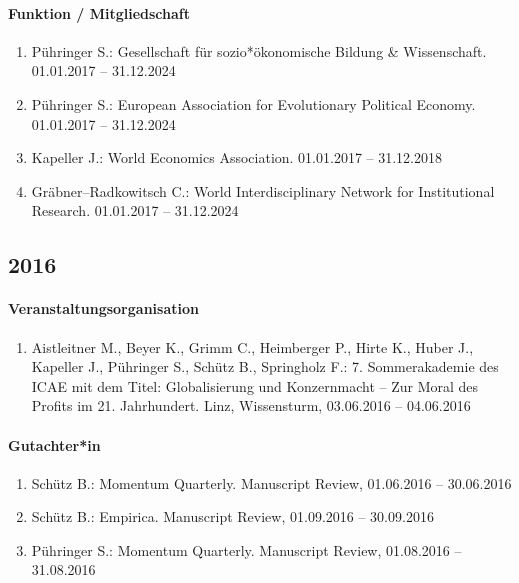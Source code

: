 \paragraph{Funktion / Mitgliedschaft}
\begin{enumerate}[leftmargin=*, labelsep=0.5cm]
\item Pühringer S.: Gesellschaft für sozio*ökonomische Bildung \& Wissenschaft. 01.01.2017 -- 31.12.2024
\item Pühringer S.: European Association for Evolutionary Political Economy. 01.01.2017 -- 31.12.2024
\item Kapeller J.: World Economics Association. 01.01.2017 -- 31.12.2018
\item Gräbner--Radkowitsch C.: World Interdisciplinary Network for Institutional Research. 01.01.2017 -- 31.12.2024
\end{enumerate}
\subsection*{2016}
\paragraph{Veranstaltungsorganisation}
\begin{enumerate}[leftmargin=*, labelsep=0.5cm]
\item Aistleitner M., Beyer K., Grimm C., Heimberger P., Hirte K., Huber J., Kapeller J., Pühringer S., Schütz B., Springholz F.: 7. Sommerakademie des ICAE mit dem Titel: Globalisierung und Konzernmacht – Zur Moral des Profits im 21. Jahrhundert. Linz, Wissensturm, 03.06.2016 -- 04.06.2016
\end{enumerate}

\paragraph{Gutachter*in}
\begin{enumerate}[leftmargin=*, labelsep=0.5cm]
\item Schütz B.: Momentum Quarterly. Manuscript Review, 01.06.2016 -- 30.06.2016
\item Schütz B.: Empirica. Manuscript Review, 01.09.2016 -- 30.09.2016
\item Pühringer S.: Momentum Quarterly. Manuscript Review, 01.08.2016 -- 31.08.2016
\end{enumerate}

